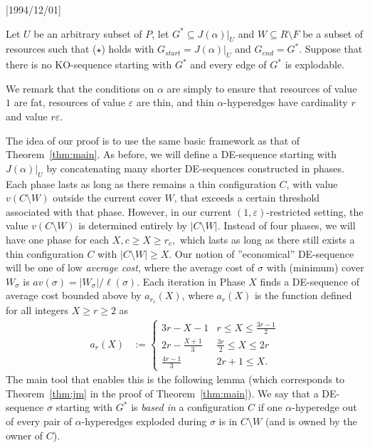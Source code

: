 \NeedsTeXFormat{LaTeX2e}[1994/12/01]\documentclass[letterpaper, 11pt]{article}
\theoremstyle{definition}
\theoremstyle{remark}
\numberwithin{equation}{section}
\newcommand{\veps}{\varepsilon}
\begin{document}
Let $U$ be an arbitrary subset of $P$, let $G^* \subseteq J(\alpha)|_U$ and  $W\subseteq R \setminus F$ be a subset of resources such
that ($\star$) holds with $G_{start}=J(\alpha)|_U$ and
$G_{end}=G^*$. Suppose that there is no KO-sequence starting with $G^*$ and every edge of $G^*$ is explodable.

\medskip

We remark that the conditions on $\alpha$ are simply to ensure that resources of value $1$ are fat, 
  resources of value $\veps$ are thin, and thin $\alpha$-hyperedges
  have cardinality $r$ and value $r\veps$. 

The idea of our proof is to use the same
basic framework as that of Theorem~\ref{thm:main}. As before, we will
define a DE-sequence starting with $J(\alpha)|_U$ by concatenating
many shorter DE-sequences constructed in
phases. Each phase lasts as long as there remains a thin
configuration $C$, with value $v(C\setminus W)$ outside the current
cover $W$, that exceeds a certain threshold associated with that phase. 
However, in our current $(1,\varepsilon)$-restricted setting, the
value $v(C\setminus W)$ is determined entirely by $|C\setminus
W|$. Instead of four phases, we will have one phase for each $X, c\geq
X \geq r_c,$ which lasts as long as there still exists a thin
configuration $C$ with $|C\setminus W| \geq X$. Our notion of
''economical'' DE-sequence will be one of low {\em average cost},
where the average cost of $\sigma$ with (minimum) cover $W_{\sigma}$ is
$av(\sigma)=|W_{\sigma}|/\ell(\sigma)$.  
Each iteration in Phase $X$ finds a DE-sequence of average cost
bounded above by $a_{r_c}(X)$, where
$a_r(X)$ is the function defined for all integers $X\geq r\geq 2$ as 
\begin{align*} 
a_r(X) & := \left\{
            \begin{array}{ll}
              3r-X-1 & r \leq X \leq \frac{3r-1}{2} \\
  2r- \frac{X+1}{3} & \frac{3r}{2} \leq X \leq 2r \\
  \frac{4r-1}{3} & 2r+1 \leq X.
\end{array}
                   \right.
                   \end{align*}
The main tool that enables this is the following lemma (which
corresponds to Theorem~\ref{thm:jm} in the proof of
Theorem~\ref{thm:main}).
We say that a DE-sequence $\sigma$ starting with $G^*$ is {\it
  based in} a 
configuration $C$ if one $\alpha$-hyperedge out of every pair of $\alpha$-hyperedges exploded
during $\sigma$ is in $C\setminus W$ (and is owned by the owner of $C$).
\end{document}
